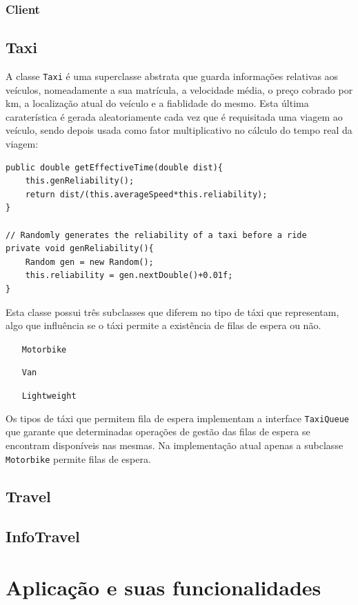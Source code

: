 \documentclass[a4paper,10pt,portuguese]{article}
\begin{document}
\subsubsection{Client}
\subsection{Taxi}
\label{Taxi}
A classe \texttt{Taxi} é uma superclasse abstrata que guarda informações relativas aos veículos, nomeadamente a sua matrícula, a velocidade média, o preço cobrado por km, a localização atual do veículo e a fiablidade do mesmo. Esta última caraterística é gerada aleatoriamente cada vez que é requisitada uma viagem ao veículo, sendo depois usada como fator multiplicativo no cálculo do tempo real da viagem:
\begin{verbatim}
public double getEffectiveTime(double dist){
    this.genReliability();
    return dist/(this.averageSpeed*this.reliability);
}
    
// Randomly generates the reliability of a taxi before a ride
private void genReliability(){
    Random gen = new Random();
    this.reliability = gen.nextDouble()+0.01f;
}
\end{verbatim}
Esta classe possui três subclasses que diferem no tipo de táxi que representam, algo que influência se o táxi permite a existência de filas de espera ou não.
\begin{itemize}
	\item[\texttt{Motorbike\label{Motorbike}}]
	\item[\texttt{Van}]
	\item[\texttt{Lightweight}]
\end{itemize}
Os tipos de táxi que permitem fila de espera implementam a interface \texttt{TaxiQueue} que garante que determinadas operações de gestão das filas de espera se encontram disponíveis nas mesmas. Na implementação atual apenas a subclasse \texttt{Motorbike} permite filas de espera.
\subsection{Travel}
\subsection{InfoTravel}

\section{Aplicação e suas funcionalidades}
\end{document}
